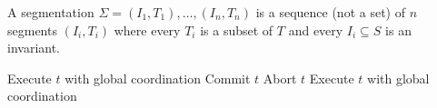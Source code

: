 \begin{frame}
  A segmentation $\Sigma = (I_1, T_1), \ldots, (I_n, T_n)$ is a sequence (not a
  set) of $n$ segments $(I_i, T_i)$ where every $T_i$ is a subset of $T$ and
  every $I_i \subseteq S$ is an invariant.
\end{frame}

\begin{frame}
  \begin{algorithmic}
      \State Execute $t$ with global coordination
    \Else{}
       Commit $t$
       Abort $t$
      \Else{} Execute $t$ with global coordination
      \EndIf{}
    \EndIf{}
  \end{algorithmic}
\end{frame}
